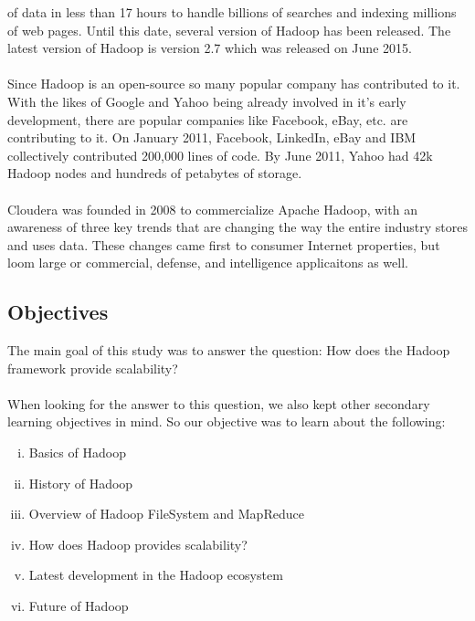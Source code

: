 \documentclass[a4paper,12pt,oneside]{report}
\begin{document}
of data in less than 17 hours to handle billions of searches and indexing millions of web pages.
Until this date, several version of Hadoop has been released. The latest version of Hadoop is version 2.7 which was released on June 2015.\\
\\
Since Hadoop is an open-source so many popular company has contributed to it. With the likes of Google and Yahoo being already involved in it's early
development, there are popular companies like Facebook, eBay, etc. are contributing to it. On January 2011, Facebook, LinkedIn, eBay and IBM collectively contributed 200,000 lines of code. By June 2011, Yahoo had 
42k Hadoop nodes and hundreds of petabytes of storage.\cite{Wikiapache}\\
\\
Cloudera was founded in 2008 to commercialize Apache Hadoop, with an awareness of three key trends that are changing the way the entire industry stores and uses data. These changes came first to consumer Internet properties, but loom large or commercial, defense, and
intelligence applicaitons as well.

\subsection{Objectives}
The main goal of this study was to answer the question: How does the Hadoop framework
provide scalability?\\
\\
When looking for the answer to this question, we also kept other secondary learning
objectives in mind. So our objective was to learn about the following:
\begin{enumerate}[(i)]
        \item Basics of Hadoop
        \item History of Hadoop
        \item Overview of Hadoop FileSystem and MapReduce
        \item How does Hadoop provides scalability?
        \item Latest development in the Hadoop ecosystem
        \item Future of Hadoop
\end{enumerate}
\end{document}
